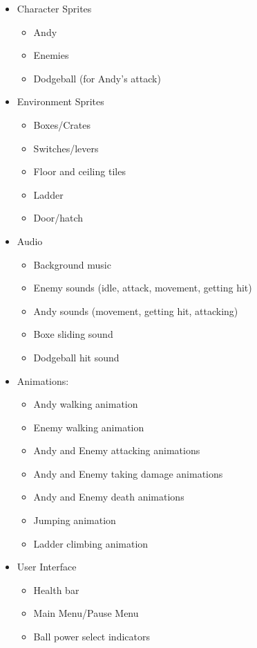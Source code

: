 \documentclass [12pt]{article}
\begin{document}
\begin{itemize}
\item Character Sprites
	\begin{itemize}
	\item Andy
	\item Enemies
	\item Dodgeball (for Andy's attack)
	\end{itemize}

\item Environment Sprites
	\begin{itemize}
	\item Boxes/Crates
	\item Switches/levers
	\item Floor and ceiling tiles
	\item Ladder
	\item Door/hatch
	\end{itemize}

\item Audio
	\begin{itemize}
	\item Background music
	\item Enemy sounds (idle, attack, movement, getting hit)
	\item Andy sounds (movement, getting hit, attacking)
	\item Boxe sliding sound
	\item Dodgeball hit sound
	\end{itemize}

\item Animations:
	\begin{itemize}
	\item Andy walking animation
	\item Enemy walking animation
	\item Andy and Enemy attacking animations
	\item Andy and Enemy taking damage animations
	\item Andy and Enemy death animations
	\item Jumping animation
	\item Ladder climbing animation
	\end{itemize}

\item User Interface
	\begin{itemize}
	\item Health bar
	\item Main Menu/Pause Menu
	\item Ball power select indicators
	\end{itemize}
\end{itemize}
\end{document}
